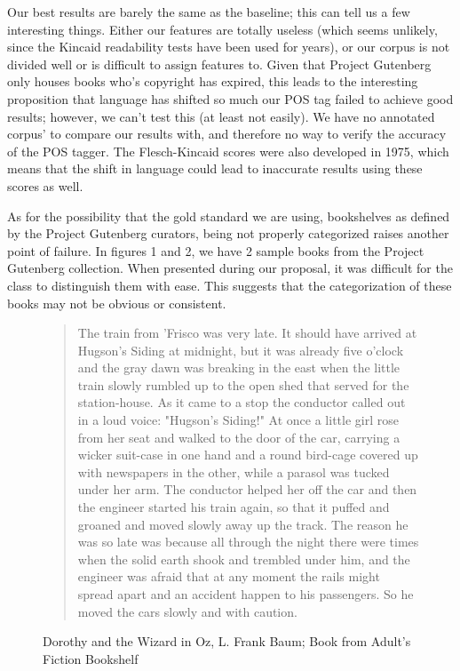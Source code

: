 \documentclass[]{article}
\begin{document}
Our best results are barely the same as the baseline; this can tell us a few interesting things.
Either our features are totally useless (which seems unlikely, since the Kincaid readability tests have been used for years), or our corpus is not divided well or is difficult to assign features to.
Given that Project Gutenberg only houses books who's copyright has expired, this leads to the interesting proposition that language has shifted so much our POS tag failed to achieve good results; however, we can't test this (at least not easily).
We have no annotated corpus' to compare our results with, and therefore no way to verify the accuracy of the POS tagger.
The Flesch-Kincaid scores were also developed in 1975, which means that the shift in language could lead to inaccurate results using these scores as well.

As for the possibility that the gold standard we are using, bookshelves as defined by the Project Gutenberg curators, being not properly categorized raises another point of failure.
In figures 1 and 2, we have 2 sample books from the Project Gutenberg collection.
When presented during our proposal, it was difficult for the class to distinguish them with ease.
This suggests that the categorization of these books may not be obvious or consistent.

\begin{figure}
	\begin{quotation}
		The train from 'Frisco was very late.  It should have arrived at Hugson's Siding at midnight, but it was already five o'clock and the gray dawn was breaking in the east when the little train slowly rumbled up to the open shed that served for the station-house.  As it came to a stop the conductor called out in a loud voice:
		"Hugson's Siding!"
		At once a little girl rose from her seat and walked to the door of the
		car, carrying a wicker suit-case in one hand and a round bird-cage
		covered up with newspapers in the other, while a parasol was tucked under her arm.  The conductor helped her off the car and then the engineer started his train again, so that it puffed and groaned and moved slowly away up the track.  The reason he was so late was because all through the night there were times when the solid earth shook and trembled under him, and the engineer was afraid that at any moment the rails might spread apart and an accident happen to his passengers.  So he moved the cars slowly and with caution.
	\end{quotation}
	\label{figure:book1}
	\caption{Dorothy and the Wizard in Oz, L. Frank Baum; Book from Adult's Fiction Bookshelf}
\end{figure}
\end{document}
